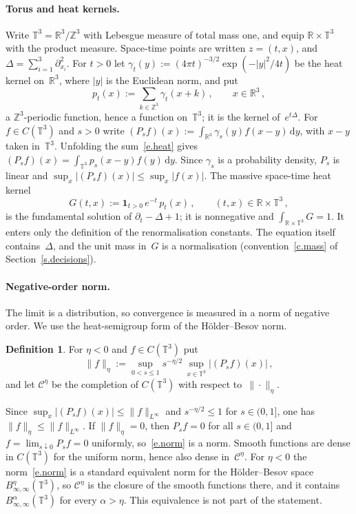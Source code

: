 \documentclass[11pt,letterpaper]{article}
\numberwithin{equation}{section}
\theoremstyle{plain}
\theoremstyle{definition}
\newtheorem{definition}[proposition]{Definition}
\theoremstyle{remark}
\newcommand{\R}{\mathbb{R}}
\newcommand{\Z}{\mathbb{Z}}
\newcommand{\T}{\mathbb{T}^3}
\newcommand{\Cs}{\mathcal{C}}
\newcommand{\nf}[2]{#1/#2}
\newcommand{\1}{\mathbf{1}}
\newcommand{\dd}{\mathrm{d}}
\begin{document}
\paragraph{Torus and heat kernels.} Write $\T=\R^3/\Z^3$ with Lebesgue measure of total mass one, and equip $\R\times\T$ with the product measure. Space-time points are written $z=(t,x)$, and $\Delta=\sum_{i=1}^3\partial_{x_i}^2$. For $t>0$ let $\gamma_t(y):=(4\pi t)^{-\nf{3}{2}}\exp(-\nf{|y|^2}{4t})$ be the heat kernel on~$\R^3$, where $|y|$ is the Euclidean norm, and put
\begin{equation}
\label{e.heat}
p_t(x) := \sum_{k\in\Z^3}\gamma_t(x+k)\,, \qquad x\in\R^3\,,
\end{equation}
a $\Z^3$-periodic function, hence a function on~$\T$; it is the kernel of~$e^{t\Delta}$. For $f\in C(\T)$ and $s>0$ write $(P_sf)(x):=\int_{\R^3}\gamma_s(y)f(x-y)\,\dd y$, with $x-y$ taken in~$\T$. Unfolding the sum~\eqref{e.heat} gives $(P_sf)(x)=\int_{\T}p_s(x-y)f(y)\,\dd y$. Since $\gamma_s$ is a probability density, $P_s$ is linear and $\sup_x|(P_sf)(x)|\le\sup_x|f(x)|$. The massive space-time heat kernel
\begin{equation}
\label{e.G}
G(t,x) := \1_{t>0}\,e^{-t}\,p_t(x)\,, \qquad (t,x)\in\R\times\T\,,
\end{equation}
is the fundamental solution of $\partial_t-\Delta+1$; it is nonnegative and $\int_{\R\times\T}G=1$. It enters only the definition of the renormalisation constants. The equation itself contains~$\Delta$, and the unit mass in~$G$ is a normalisation (convention~\ref{c.mass} of Section~\ref{s.decisions}).

\paragraph{Negative-order norm.} The limit is a distribution, so convergence is measured in a norm of negative order. We use the heat-semigroup form of the Hölder--Besov norm.

\begin{definition}
\label{d.norm}
For $\eta<0$ and $f\in C(\T)$ put
\begin{equation}
\label{e.norm}
\|f\|_{\eta} := \sup_{0<s\le 1} s^{-\nf{\eta}{2}}\,\sup_{x\in\T}|(P_sf)(x)|\,,
\end{equation}
and let $\Cs^\eta$ be the completion of $C(\T)$ with respect to~$\|\cdot\|_\eta$.
\end{definition}

Since $\sup_x|(P_sf)(x)|\le\|f\|_{L^\infty}$ and $s^{-\nf{\eta}{2}}\le1$ for $s\in(0,1]$, one has $\|f\|_\eta\le\|f\|_{L^\infty}$. If $\|f\|_\eta=0$, then $P_sf=0$ for all $s\in(0,1]$ and $f=\lim_{s\downarrow0}P_sf=0$ uniformly, so~\eqref{e.norm} is a norm. Smooth functions are dense in $C(\T)$ for the uniform norm, hence also dense in~$\Cs^\eta$. For $\eta<0$ the norm~\eqref{e.norm} is a standard equivalent norm for the Hölder--Besov space $B^\eta_{\infty,\infty}(\T)$, so $\Cs^\eta$ is the closure of the smooth functions there, and it contains $B^\alpha_{\infty,\infty}(\T)$ for every $\alpha>\eta$. This equivalence is not part of the statement.
\end{document}
